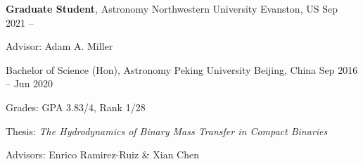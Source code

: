 


\begin{cventries}



\cventry
{{\bf Graduate Student}, Astronomy} %
{Northwestern University} %
{Evanston, US} %
{Sep 2021 -- } %
{ \begin{cvitems}
	\item {Advisor: Adam A. Miller}
\end{cvitems}
}

\cventry
{{Bachelor of Science (Hon)}, Astronomy} %
{Peking University} %
{Beijing, China} %
{Sep 2016 -- Jun 2020} %
{ %
	\begin{cvitems}
		\item {Grades: GPA 3.83/4, Rank 1/28}
		\item {Thesis: \textit{The Hydrodynamics of Binary Mass Transfer in Compact Binaries}}
		\item {Advisors: Enrico Ramirez-Ruiz \& Xian Chen}
	\end{cvitems}
}

\end{cventries}